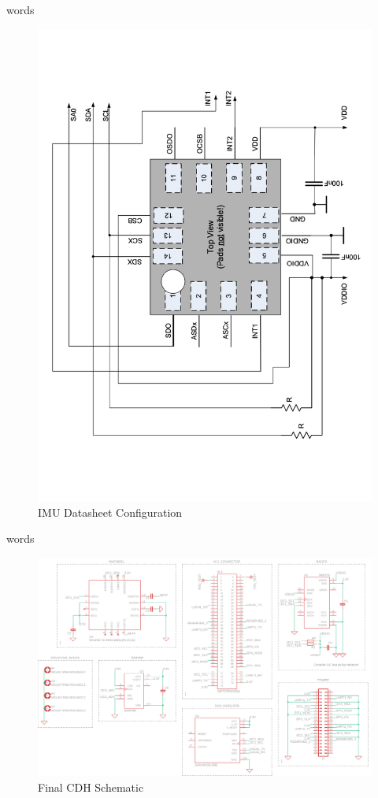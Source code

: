 \documentclass{report}
\begin{document}
                words
                \begin{figure}[H]
                    \centering
                    \includegraphics[width=0.5\linewidth, angle=270]{figures/IMU_DS.pdf}
                    \caption{IMU Datasheet Configuration}
                    \label{fig:imu_ds}
                \end{figure}
                words
                \begin{figure}[H]
                    \centering
                    \includegraphics[width=0.8\linewidth]{figures/CDH_SCHM.png}
                    \caption{Final CDH Schematic}
                    \label{fig:cdh_schm}
                \end{figure}
\end{document}
